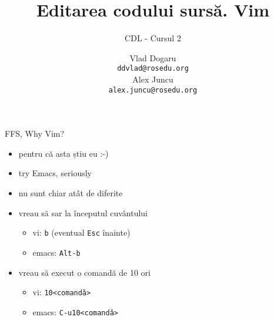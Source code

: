 \documentclass{beamer}
\title[]{Editarea codului surs\u{a}. Vim}
\subtitle{CDL - Cursul 2}
\institute[CDL 2012]{ROSEdu}
\author[]{Vlad Dogaru \\ \texttt{ddvlad@rosedu.org} \\ Alex Juncu \\
\texttt{alex.juncu@rosedu.org}}
\begin{document}
\maketitle

\tableofcontents

\begin{frame}{FFS, Why Vim?}
  \begin{itemize}
    \item pentru că asta știu eu :-)
    \pause
    \item try Emacs, seriously
    \pause
    \item nu sunt chiar atât de diferite
    \pause
    \item vreau să sar la începutul cuvântului
    \begin{itemize}
      \item vi: \texttt{b} (eventual \texttt{Esc} înainte)
      \item emacs: \texttt{Alt-b}
    \end{itemize}
    \item vreau să execut o comandă de 10 ori
    \begin{itemize}
      \item vi: \texttt{10<comandă>}
      \item emacs: \texttt{C-u10<comandă>}
    \end{itemize}
    \pause
  \end{itemize}
\end{frame}
\end{document}
